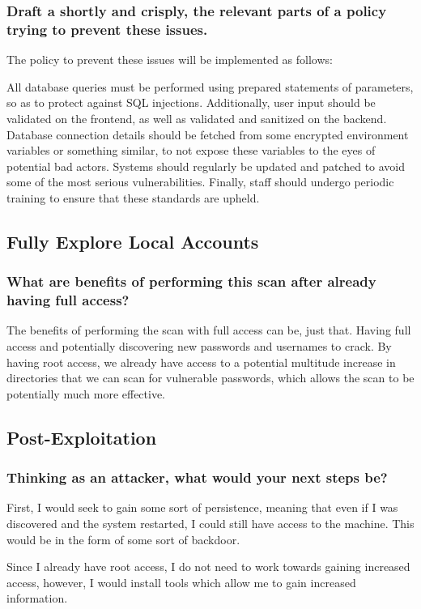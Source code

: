 \subsubsection{Draft a shortly and crisply, the relevant parts of a policy trying to prevent these issues.}
The policy to prevent these issues will be implemented as follows:

All database queries must be performed using prepared statements of parameters, so as to protect against SQL injections. Additionally, user input should be validated on the frontend, as well as validated and sanitized on the backend. Database connection details should be fetched from some encrypted environment variables or something similar, to not expose these variables to the eyes of potential bad actors. Systems should regularly be updated and patched to avoid some of the most serious vulnerabilities. Finally, staff should undergo periodic training to ensure that these standards are upheld.

\subsection{Fully Explore Local Accounts}
\subsubsection{What are benefits of performing this scan after already having full access?}
The benefits of performing the scan with full access can be, just that. Having full access and potentially discovering new passwords and usernames to crack. By having root access, we already have access to a potential multitude increase in directories that we can scan for vulnerable passwords, which allows the scan to be potentially much more effective.

\subsection{Post-Exploitation}
\subsubsection{Thinking as an attacker, what would your next steps be?}
First, I would seek to gain some sort of persistence, meaning that even if I was discovered and the system restarted, I could still have access to the machine. This would be in the form of some sort of backdoor.

Since I already have root access, I do not need to work towards gaining increased access, however, I would install tools which allow me to gain increased information.

